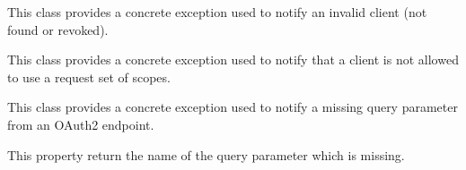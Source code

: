 \documentclass[letterpaper,10pt,english]{sphinxmanual}
\begin{document}

\begin{fulllineitems}
\label{features/oauth2/technical_summary:fantastico.oauth2.exceptions.OAuth2InvalidClientError}
This class provides a concrete exception used to notify an invalid client (not found or revoked).

\end{fulllineitems}


\begin{fulllineitems}
\label{features/oauth2/technical_summary:fantastico.oauth2.exceptions.OAuth2InvalidScopesError}
This class provides a concrete exception used to notify that a client is not allowed to use a request set of scopes.

\end{fulllineitems}


\begin{fulllineitems}
\label{features/oauth2/technical_summary:fantastico.oauth2.exceptions.OAuth2MissingQueryParamError}
This class provides a concrete exception used to notify a missing query parameter from an OAuth2 endpoint.

\begin{fulllineitems}
\label{features/oauth2/technical_summary:fantastico.oauth2.exceptions.OAuth2MissingQueryParamError.param_name}
This property return the name of the query parameter which is missing.

\end{fulllineitems}


\end{fulllineitems}

\end{document}
